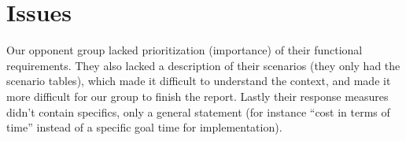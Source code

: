 
\section{Issues}
\label{sec:issues}
Our opponent group lacked prioritization (importance) of their functional
requirements. They also lacked a description of their scenarios (they only had
the scenario tables), which made it difficult to understand the context, and
made it more difficult for our group to finish the report. Lastly their
response measures didn't contain specifics, only a general statement (for
instance ``cost in terms of time'' instead of a specific goal time for
implementation).

